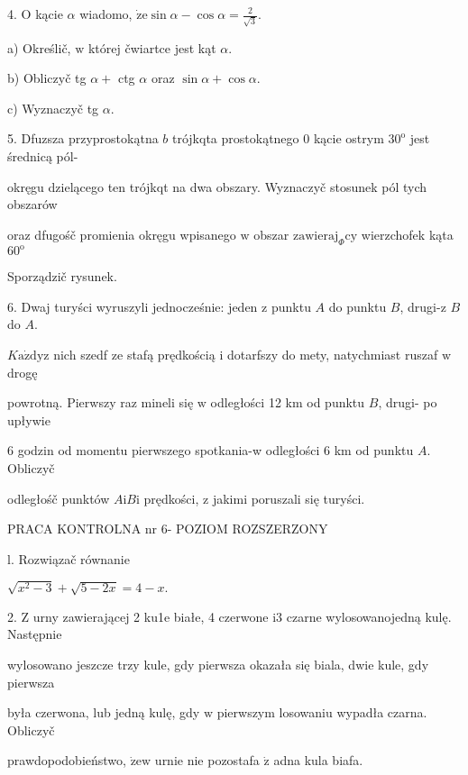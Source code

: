 \documentclass[a4paper,12pt]{article}
\begin{document}
4. $\mathrm{O}$ kącie $\alpha$ wiadomo, $\displaystyle \dot{\mathrm{z}}\mathrm{e}\sin\alpha-\cos\alpha=\frac{2}{\sqrt{3}}.$

a) Określič, $\mathrm{w}$ której čwiartce jest kąt $\alpha.$

b) Obliczyč tg $\alpha+$ ctg $\alpha$ oraz $\sin\alpha+\cos\alpha.$

c) Wyznaczyč tg $\alpha.$

5. Dfuzsza przyprostokątna $b$ trójkqta prostokątnego $0$ kącie ostrym $30^{\mathrm{o}}$ jest średnicą pól-

okręgu dzielącego ten trójkqt na dwa obszary. Wyznaczyč stosunek pól tych obszarów

oraz dfugośč promienia okręgu wpisanego $\mathrm{w}$ obszar $\mathrm{z}\mathrm{a}\mathrm{w}\mathrm{i}\mathrm{e}\mathrm{r}\mathrm{a}\mathrm{j}_{\Phi}\mathrm{c}\mathrm{y}$ wierzchofek kąta $60^{\mathrm{o}}$

Sporządzič rysunek.

6. Dwaj turyści wyruszyli jednocześnie: jeden $\mathrm{z}$ punktu $A$ do punktu $B$, drugi-z $B$ do $A.$

$K\mathrm{a}\dot{\mathrm{z}}\mathrm{d}\mathrm{y}\mathrm{z}$ nich szedf ze stafą prędkością $\mathrm{i}$ dotarfszy do mety, natychmiast ruszaf $\mathrm{w}$ drogę

powrotną. Pierwszy raz mineli się $\mathrm{w}$ odległości 12 km od punktu $B$, drugi- po upływie

6 godzin od momentu pierwszego spotkania-w odległości 6 km od punktu $A$. Obliczyč

odległośč punktów $A\mathrm{i}B\mathrm{i}$ prędkości, $\mathrm{z}$ jakimi poruszali się turyści.





PRACA KONTROLNA nr 6- POZIOM ROZSZERZONY

l. Rozwiązač równanie

$\sqrt{x^{2}-3}+\sqrt{5-2x}=4-x.$

2. $\mathrm{Z}$ urny zawierającej 2 ku1e białe, 4 czerwone $\mathrm{i}3$ czarne wylosowanojedną kulę. Następnie

wylosowano jeszcze trzy kule, gdy pierwsza okazała się biala, dwie kule, gdy pierwsza

była czerwona, lub jedną kulę, gdy $\mathrm{w}$ pierwszym losowaniu wypadła czarna. Obliczyč

prawdopodobieństwo, $\dot{\mathrm{z}}\mathrm{e}\mathrm{w}$ urnie nie pozostafa $\dot{\mathrm{z}}$ adna kula biafa.
\end{document}
